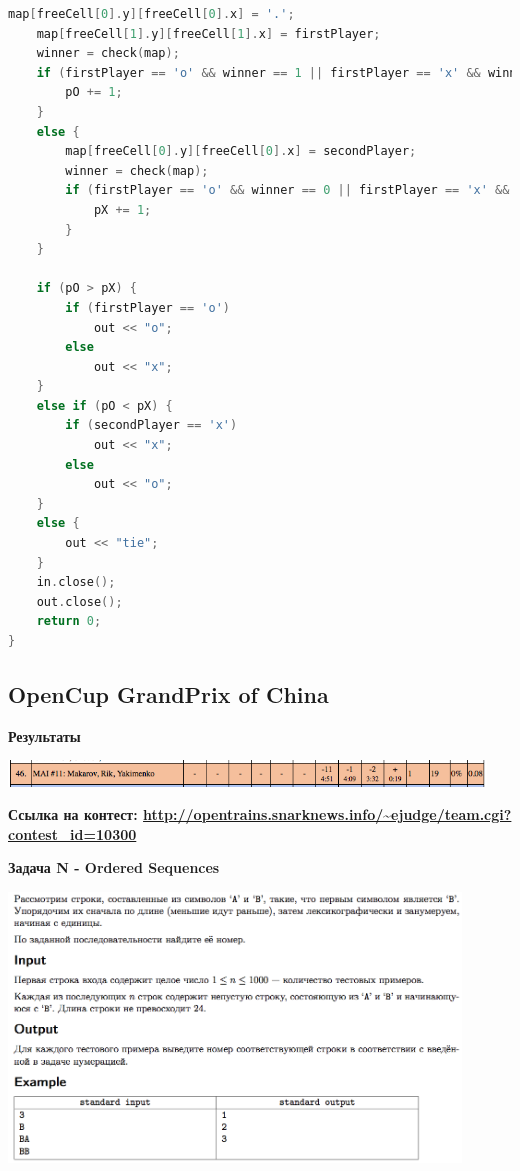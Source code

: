 \documentclass[a4paper,12pt]{article}
\begin{document}
\begin{lstlisting}[language=C++]
    map[freeCell[0].y][freeCell[0].x] = '.';
    map[freeCell[1].y][freeCell[1].x] = firstPlayer;
    winner = check(map);
    if (firstPlayer == 'o' && winner == 1 || firstPlayer == 'x' && winner == 0) {
        pO += 1;
    }
    else {
        map[freeCell[0].y][freeCell[0].x] = secondPlayer;
        winner = check(map);
        if (firstPlayer == 'o' && winner == 0 || firstPlayer == 'x' && winner == 1) {
            pX += 1;
        }
    }

    if (pO > pX) {
        if (firstPlayer == 'o')
            out << "o";
        else
            out << "x";
    }
    else if (pO < pX) {
        if (secondPlayer == 'x')
            out << "x";
        else
            out << "o";
    }
    else {
        out << "tie";
    }
    in.close();
    out.close();
    return 0;
}
\end{lstlisting}



%
%
\newpage
\subsection{OpenCup GrandPrix of China}

\textbf{{\large Результаты}} \\
\begin{center}
\includegraphics[width=0.95\textwidth]{OC_China/OC_China_result.png}\\ [1cm]
\end{center}

\textbf{{\large Ссылка на контест: \url{http://opentrains.snarknews.info/~ejudge/team.cgi?contest_id=10300}}}

\newpage
\textbf{{\large Задача N - Ordered Sequences}}

\begin{center}
\includegraphics[width=0.9\textwidth]{OC_China/OC_China_N.png}\\ [1cm]
\end{center}
\end{document}
